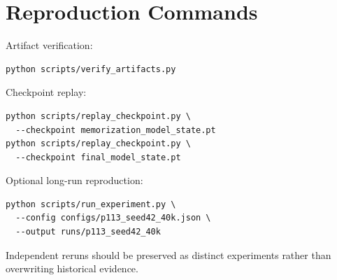 \section{Reproduction Commands}
Artifact verification:
\begin{verbatim}
python scripts/verify_artifacts.py
\end{verbatim}
Checkpoint replay:
\begin{verbatim}
python scripts/replay_checkpoint.py \
  --checkpoint memorization_model_state.pt
python scripts/replay_checkpoint.py \
  --checkpoint final_model_state.pt
\end{verbatim}
Optional long-run reproduction:
\begin{verbatim}
python scripts/run_experiment.py \
  --config configs/p113_seed42_40k.json \
  --output runs/p113_seed42_40k
\end{verbatim}
Independent reruns should be preserved as distinct experiments rather than overwriting historical evidence.
